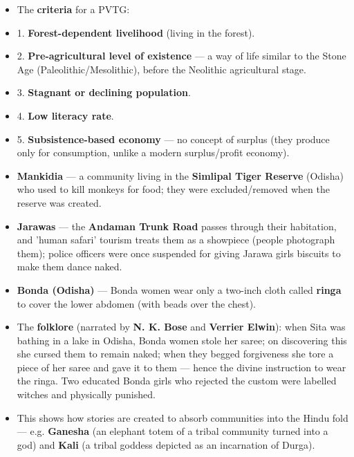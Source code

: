 \begin{KeyConcept}
\begin{itemize}
\item The \textbf{criteria} for a PVTG:
\item 1. \textbf{Forest-dependent livelihood} (living in the forest).
\item 2. \textbf{Pre-agricultural level of existence} --- a way of life similar to the Stone Age (Paleolithic/Mesolithic), before the Neolithic agricultural stage.
\item 3. \textbf{Stagnant or declining population}.
\item 4. \textbf{Low literacy rate}.
\item 5. \textbf{Subsistence-based economy} --- no concept of surplus (they produce only for consumption, unlike a modern surplus/profit economy).
\end{itemize}
\end{KeyConcept}

\begin{ExampleBox}
\begin{itemize}
\item \textbf{Mankidia} --- a community living in the \textbf{Simlipal Tiger Reserve} (Odisha) who used to kill monkeys for food; they were excluded/removed when the reserve was created.
\item \textbf{Jarawas} --- the \textbf{Andaman Trunk Road} passes through their habitation, and 'human safari' tourism treats them as a showpiece (people photograph them); police officers were once suspended for giving Jarawa girls biscuits to make them dance naked.
\item \textbf{Bonda (Odisha)} --- Bonda women wear only a two-inch cloth called \textbf{ringa} to cover the lower abdomen (with beads over the chest).
\item The \textbf{folklore} (narrated by \textbf{N. K. Bose} and \textbf{Verrier Elwin}): when Sita was bathing in a lake in Odisha, Bonda women stole her saree; on discovering this she cursed them to remain naked; when they begged forgiveness she tore a piece of her saree and gave it to them --- hence the divine instruction to wear the ringa. Two educated Bonda girls who rejected the custom were labelled witches and physically punished.
\item This shows how stories are created to absorb communities into the Hindu fold --- e.g. \textbf{Ganesha} (an elephant totem of a tribal community turned into a god) and \textbf{Kali} (a tribal goddess depicted as an incarnation of Durga).
\end{itemize}
\end{ExampleBox}

